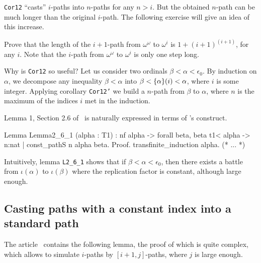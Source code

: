\begin{remark}
 \texttt{Cor12} ``casts'' $i$-paths into $n$-paths for any $n>i$.
But the obtained $n$-path can be much longer than the original $i$-path.
The following exercise will give an idea of this increase. 
\end{remark}

\begin{exercise}
  Prove that  the length of the $i+1$-path from
  $\omega^\omega$ to $\omega^i$ is $1 + (i+1)^{(i+1)}$, for any $i$. Note that the $i$-path from
  $\omega^\omega$ to $\omega^i$ is only one step long.
 \end{exercise}


Why is \texttt{Cor12} so useful? 
Let us  consider two ordinals  $\beta<\alpha<\epsilon_0$. By induction on $\alpha$,
we decompose any inequality $\beta<\alpha$ into $\beta < \mbox{$\{\alpha\}(i)$}< \alpha$, where $i$ is some integer. Applying corollary \texttt{Cor12'} we build a $n$-path from $\beta$ to $\alpha$,
where $n$ is the maximum of the indices $i$ met in the induction.

 Lemma 1, Section 2.6 of~\cite{KS81} is naturally expressed in terms of \coq's
\verb@sig@ construct.

\label{lemma:L-2_6-1}

\begin{Coqsrc}
Lemma Lemma2_6_1 (alpha : T1) :  
  nf alpha -> forall beta,  beta t1< alpha  ->
  {n:nat | const_pathS n alpha beta}.
Proof.
  transfinite_induction alpha.
  (* ... *)
\end{Coqsrc}



Intuitively, lemma   \texttt{L2\_6\_1}  shows that if $\beta<\alpha<\epsilon_0$, then there exists  a battle from $\iota(\alpha)$ to $\iota(\beta)$ where the replication factor is constant, although large enough. 







\subsection{Casting paths with a constant index into a standard path}


The article~\cite{KS81} contains 
the following lemma, the proof of which is quite complex, which allows to simulate $i$-paths by $[i+1,j]$-paths, where $j$ is large enough.


